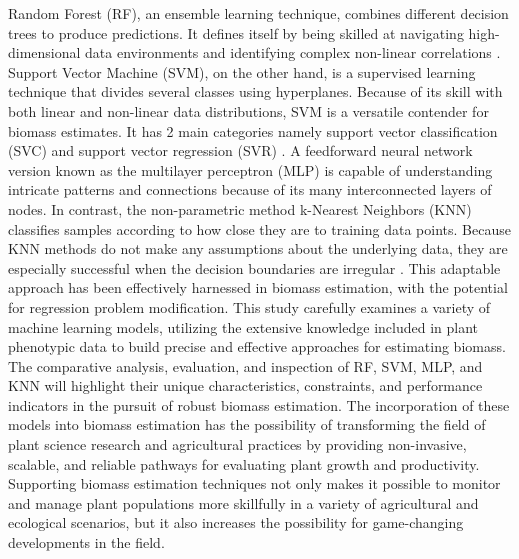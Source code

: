 \documentclass[a4paper,12pt]{report}%
\renewcommand{\\}{\vspace*{0.5\baselineskip} \newline}
\begin{document}
\noindent Random Forest (RF), an ensemble learning technique, combines different decision trees to produce predictions. It defines itself by being skilled at navigating high-dimensional data environments and identifying complex non-linear correlations \cite{4}. Support Vector Machine (SVM), on the other hand, is a supervised learning technique that divides several classes using hyperplanes. Because of its skill with both linear and non-linear data distributions, SVM is a versatile contender for biomass estimates. It has 2 main categories namely support vector classification (SVC) and support vector regression (SVR) \cite{5}. A feedforward neural network version known as the multilayer perceptron (MLP) is capable of understanding intricate patterns and connections because of its many interconnected layers of nodes\cite{6}. In contrast, the non-parametric method k-Nearest Neighbors (KNN) classifies samples according to how close they are to training data points. Because KNN methods do not make any assumptions about the underlying data, they are especially successful when the decision boundaries are irregular \cite{7}. This adaptable approach has been effectively harnessed in biomass estimation, with the potential for regression problem modification.
This study carefully examines a variety of machine learning models, utilizing the extensive knowledge included in plant phenotypic data to build precise and effective approaches for estimating biomass. The comparative analysis, evaluation, and inspection of RF, SVM, MLP, and KNN will highlight their unique characteristics, constraints, and performance indicators in the pursuit of robust biomass estimation. The incorporation of these models into biomass estimation has the possibility of transforming the field of plant science research and agricultural practices by providing non-invasive, scalable, and reliable pathways for evaluating plant growth and productivity. Supporting biomass estimation techniques not only makes it possible to monitor and manage plant populations more skillfully in a variety of agricultural and ecological scenarios, but it also increases the possibility for game-changing developments in the field.
\end{document}
